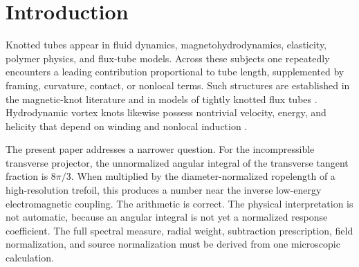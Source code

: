 \documentclass[aps,pre,preprint,notitlepage,nofootinbib,superscriptaddress]{revtex4-2}
\begin{document}
\begin{abstract}
The numerical provenance is also corrected.  The high-resolution study reports a polygonal length $L_p$, an inscribed-curve upper bound $L_c$, and a weighted estimate $L_a$; these quantities have different epistemic status.  Their internal spread is far smaller than the separation between the high-resolution and rounded Fourier branches, which is itself about eighty times smaller than the external residual.  Finally, a gauge interpretation is retained only as an open matching hypothesis requiring independent source normalization, a protected $U(1)$ constraint, two physical transverse modes, static--radiative universality, and one Lorentz-invariant infrared causal cone shared with matter.  The trefoil number is therefore a normalization-dependent geometric coincidence and a falsification target, not a derived fine-structure constant.
\end{abstract}


\maketitle

\section{Introduction}

Knotted tubes appear in fluid dynamics, magnetohydrodynamics, elasticity, polymer physics, and flux-tube models.  Across these subjects one repeatedly encounters a leading contribution proportional to tube length, supplemented by framing, curvature, contact, or nonlocal terms.  Such structures are established in the magnetic-knot literature and in models of tightly knotted flux tubes \cite{ChuiMoffatt1995,MaggioniRicca2009,BuniyKephart2005,BuniyEtAl2014}.  Hydrodynamic vortex knots likewise possess nontrivial velocity, energy, and helicity that depend on winding and nonlocal induction \cite{MaggioniEtAl2009,MaggioniEtAl2010}.

The present paper addresses a narrower question.  For the incompressible transverse projector, the unnormalized angular integral of the transverse tangent fraction is $8\pi/3$.  When multiplied by the diameter-normalized ropelength of a high-resolution trefoil, this produces a number near the inverse low-energy electromagnetic coupling.  The arithmetic is correct.  The physical interpretation is not automatic, because an angular integral is not yet a normalized response coefficient.  The full spectral measure, radial weight, subtraction prescription, field normalization, and source normalization must be derived from one microscopic calculation.
\end{document}

